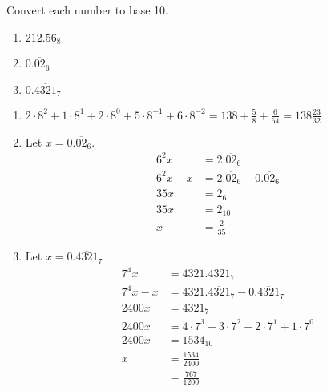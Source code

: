 \documentclass{article}
\begin{document}
\begin{problem}{}{}
    Convert each number to base 10.
    \begin{enumerate}[label=\textbf{\arabic*}.]
        \item $212.56_8$
        \item $0.\overline{02}_6$
        \item $0.\overline{4321}_7$
    \end{enumerate}
\end{problem}
\begin{solution}{}{}
    \begin{enumerate}[label=\textbf{\arabic*}.]
        \item $2\cdot8^2+1\cdot8^1+2\cdot8^0+5\cdot8^{-1}+6\cdot8^{-2}=138+\frac{5}{8}+\frac{6}{64}=138\frac{23}{32}$
        \item Let $x=0.\overline{02}_6$.
        \begin{align*}
            6^2x &= 2.\overline{02}_6 \\
            6^2x - x &= 2.\overline{02}_6 - 0.\overline{02}_6 \\
            35x &= 2_6 \\
            35x&=2_{10} \\
            x &= \frac{2}{35}
        \end{align*}
        \item Let $x=0.\overline{4321}_7$
        \begin{align*}
            7^4x &= 4321.\overline{4321}_7 \\
            7^4x - x &= 4321.\overline{4321}_7 - 0.\overline{4321}_7 \\
            2400x &= 4321_7 \\
            2400x &= 4\cdot7^3+3\cdot7^2+2\cdot7^1+1\cdot7^0 \\
            2400x &= 1534_{10} \\
            x&=\frac{1534}{2400} \\
            &= \frac{767}{1200} 
        \end{align*}
    \end{enumerate}
\end{solution}
\end{document}
